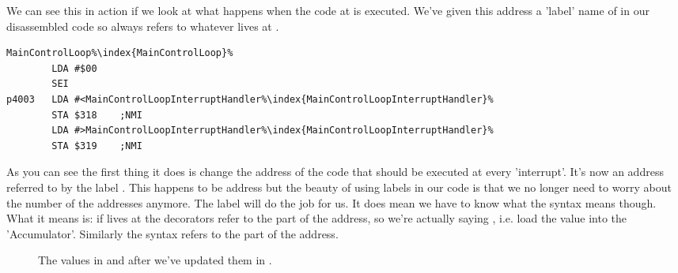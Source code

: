 We can see this in action if we look at what happens when the code at  is executed. We've given this address 
a 'label' name of  in our disassembled code so  always refers to whatever lives at
. 

\begin{lstlisting}[caption=The code at \icode{\$4000}. ,escapechar=\%]
MainControlLoop%\index{MainControlLoop}%
        LDA #$00
        SEI
p4003   LDA #<MainControlLoopInterruptHandler%\index{MainControlLoopInterruptHandler}%
        STA $318    ;NMI
        LDA #>MainControlLoopInterruptHandler%\index{MainControlLoopInterruptHandler}%
        STA $319    ;NMI
\end{lstlisting}

As you can see the first thing it does is change the address of the code that should be executed at every 'interrupt'. It's now an
address referred to by the label . This happens to be address  but the beauty
of using labels in our code is that we no longer need to worry about the number of the addresses anymore. The label will do the job
for us. It does mean we have to know what the syntax  means though. What it means is:
if  lives at  the \icode{\#<} decorators refer to the  part of the
address, so we're actually saying , i.e. load the value  into the 'Accumulator'. Similarly the syntax
 refers to the  part of the address.

\begin{figure}[H]
  {
    \setlength{\tabcolsep}{3.0pt}
    \setlength\cmidrulewidth{\heavyrulewidth} %
    \begin{adjustbox}{width=7cm,center}
    \end{adjustbox}
  }\caption{The values in  and  after we've updated them in .}
\end{figure}


